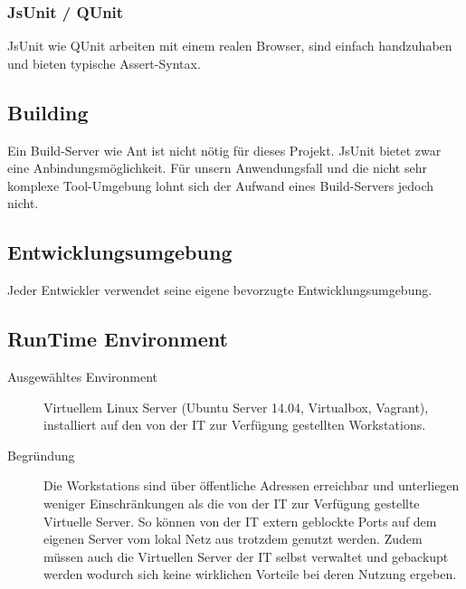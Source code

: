 			\subsubsection{JsUnit / QUnit}
				JsUnit wie QUnit arbeiten mit einem realen Browser, sind einfach handzuhaben und bieten typische Assert-Syntax.


		\subsection{Building}
			Ein Build-Server wie Ant ist nicht nötig für dieses Projekt. JsUnit bietet zwar
			eine Anbindungsmöglichkeit. Für unsern Anwendungsfall und die nicht sehr
			komplexe Tool-Umgebung lohnt sich der Aufwand eines Build-Servers jedoch nicht.


		\subsection{Entwicklungsumgebung}
			Jeder Entwickler verwendet seine eigene bevorzugte Entwicklungsumgebung. 


		\subsection{RunTime Environment}
			\begin{description}
				\item[Ausgewähltes Environment] Virtuellem Linux Server (Ubuntu Server 14.04, Virtualbox, Vagrant), installiert auf den von der IT zur Verfügung gestellten Workstations.
				\item[Begründung]	 Die Workstations sind über öffentliche Adressen erreichbar und unterliegen weniger Einschränkungen als die von der IT zur Verfügung gestellte Virtuelle Server. So können von der IT extern geblockte Ports auf dem eigenen Server vom lokal Netz aus trotzdem genutzt werden. Zudem müssen auch die Virtuellen Server der IT selbst verwaltet und gebackupt werden wodurch sich keine wirklichen Vorteile bei deren Nutzung ergeben.
			\end{description}
